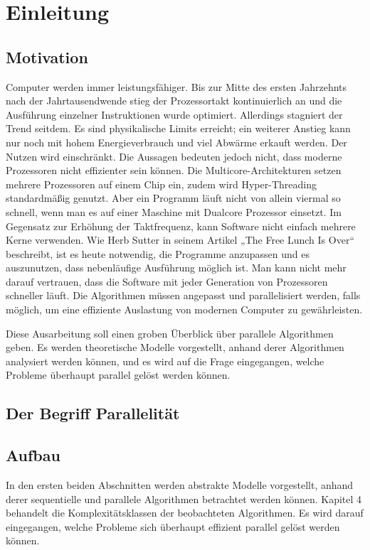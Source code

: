 \section{Einleitung}

\subsection{Motivation}
Computer werden immer leistungsfähiger.
Bis zur Mitte des ersten Jahrzehnts nach der Jahrtausendwende stieg der
Prozessortakt kontinuierlich an und die Ausführung einzelner Instruktionen
wurde optimiert.
Allerdings stagniert der Trend seitdem.
Es sind physikalische Limits erreicht; ein weiterer Anstieg kann nur noch
mit hohem Energieverbrauch und viel Abwärme erkauft werden.
Der Nutzen wird einschränkt.
Die Aussagen bedeuten jedoch nicht, dass moderne Prozessoren nicht effizienter
sein können.
Die Multicore-Architekturen setzen mehrere Prozessoren auf einem Chip ein,
zudem wird Hyper-Threading standardmäßig genutzt.
Aber ein Programm läuft nicht von allein viermal so schnell, wenn man es auf
einer Maschine mit Dualcore Prozessor einsetzt.
Im Gegensatz zur Erhöhung der Taktfrequenz, kann Software nicht einfach mehrere
Kerne verwenden.
Wie Herb Sutter in seinem Artikel „The Free Lunch Is Over“
\cite{sutterlunch} beschreibt, ist es heute notwendig, die Programme anzupassen
und es auszunutzen, dass nebenläufige Ausführung möglich ist.
Man kann nicht mehr darauf vertrauen, dass die Software mit jeder Generation
von Prozessoren schneller läuft.
Die Algorithmen müssen angepasst und parallelisiert werden, falls möglich, um
eine effiziente Auslastung von modernen Computer zu gewährleisten.

Diese Ausarbeitung soll einen groben Überblick über parallele Algorithmen geben.
Es werden theoretische Modelle vorgestellt, anhand derer Algorithmen analysiert
werden können, und es wird auf die Frage eingegangen, welche Probleme überhaupt
parallel gelöst werden können.

\subsection{Der Begriff Parallelität}

\subsection{Aufbau}
In den ersten beiden Abschnitten werden abstrakte Modelle vorgestellt, anhand
derer sequentielle und parallele Algorithmen betrachtet werden können.
Kapitel 4 behandelt die Komplexitätsklassen der beobachteten Algorithmen.
Es wird darauf eingegangen, welche Probleme sich überhaupt effizient parallel
gelöst werden können.

